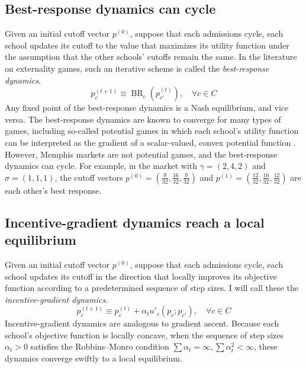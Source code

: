 \documentclass[12pt]{article}
\numberwithin{equation}{subsection}
\theoremstyle{definition}
\begin{document}
\subsection{Best-response dynamics can cycle}
Given an initial cutoff vector $p^{(0)}$, suppose that each admissions cycle, each school updates its cutoff to the value that maximizes its utility function under the assumption that the other schools' cutoffs remain the same. In the literature on externality games, such an iterative scheme is called the \emph{best-response dynamics}. 
\begin{equation} \label{bestresponsedynamics}
p_c^{(t+1)} \equiv \operatorname{BR}_c  (p_{c'}^{(t)}), \quad \forall c \in C
\end{equation}
Any fixed point of the best-response dynamics is a Nash equilibrium, and vice versa. The best-response dynamics are known to converge for many types of games, including so-called potential games in which each school's utility function can be interpreted as the gradient of a scalar-valued, convex potential function \parencite[][chap. 19]{algorithmicgametheory}. However, Memphis markets are not potential games, and the best-response dynamics can cycle. For example, in the market with $\gamma = (2, 4, 2)$ and $\sigma = (1, 1, 1)$, the cutoff vectors $p^{(0)} = \left(\frac{9}{32}, \frac{16}{32}, \frac{9}{32}\right)$ and $p^{(1)}= \left(\frac{12}{32}, \frac{16}{32}, \frac{12}{32}\right)$ are each other's best response. 

\subsection{Incentive-gradient dynamics reach a local equilibrium}
Given an initial cutoff vector $p^{(0)}$, suppose that each admissions cycle, each school updates its cutoff in the direction that locally improves its objective function according to a predetermined sequence of step sizes. I will call these the \emph{incentive-gradient dynamics}.
\begin{equation} \label{incentivegradientdynamics}
p_c^{(t+1)} \equiv p_{c}^{(t)} + \alpha_t u'_c(p_c; p_{c'}), \quad \forall c \in C
\end{equation}
Incentive-gradient dynamics are analogous to gradient ascent. Because each school's objective function is locally concave, when the sequence of step sizes $\alpha_t > 0$ satisfies the Robbins--Monro condition $\sum \alpha_t = \infty, \sum \alpha_t^2 < \infty$, these dynamics converge swiftly to a local equilibrium.
\end{document}

